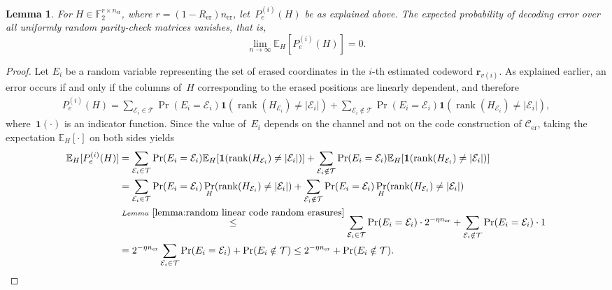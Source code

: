 \documentclass[journal,letterpaper,onecolumn,11pt]{IEEEtran}
\newcommand{\cC}{\mathcal{C}}
\newcommand{\cE}{\mathcal{E}}
\newcommand{\cT}{\mathcal{T}}
\newcommand{\rank}{\operatorname{rank}}
\newtheorem{lemma}{Lemma}
\begin{document}
\begin{lemma}\label{lemma:random_matrix_capacity}
    For $H \in \mathbb{F}_2^{r \times n_{\mathrm{er}}}$, where $r = (1-R_{\mathrm{er}})n_{\mathrm{er}}$, let~$P_e^{(i)}(H)$ be as explained above. 
    The expected probability of decoding error over all uniformly random parity-check matrices vanishes, that is,
    $$ \lim_{n \to \infty} \mathbb{E}_H[P_e^{(i)}(H)] = 0.$$
\end{lemma}
\begin{proof}
    Let $E_i$ be a random variable representing the set of erased coordinates in the $i$-th estimated codeword $\hat{\mathbf{r}}_{v(i)}$.
    As explained earlier, an error occurs if and only if the columns of~$H$ corresponding to the erased positions are linearly dependent, and therefore
    \begin{align*}
        P_e^{(i)}(H)=\sum_{\cE_i\in\mathcal{T}}\Pr(E_i=\cE_i)\mathbf{1}(\rank(H_{\cE_i})\ne |\cE_i|)+\sum_{\cE_i\notin\mathcal{T}}\Pr(E_i=\cE_i)\mathbf{1}(\rank(H_{\cE_i})\ne |\cE_i|),
    \end{align*}
    where~$\mathbf{1}(\cdot)$ is an indicator function.
    Since the value of~$E_i$ depends on the channel and not on the code construction of $\cC_{\mathrm{er}}$, taking the expectation $\mathbb{E}_H[\cdot]$ on both sides yields
    \begin{align*}
        \mathbb{E}_H[P_e^{(i)}(H)] &= \sum_{\cE_i\in\mathcal{T}}\Pr(E_i=\cE_i)\mathbb{E}_H[\mathbf{1}(\rank(H_{\cE_i})\ne |\cE_i|)]  + \sum_{\cE_i\notin\mathcal{T}}\Pr(E_i=\cE_i)\mathbb{E}_H[\mathbf{1}(\rank(H_{\cE_i})\ne |\cE_i|)]\\
        &=\sum_{\cE_i\in\mathcal{T}}\Pr(E_i=\cE_i)\Pr_H(\rank(H_{\cE_i})\ne |\cE_i|)  + \sum_{\cE_i\notin\mathcal{T}}\Pr(E_i=\cE_i)\Pr_H(\rank(H_{\cE_i})\ne |\cE_i|)\\
        &\overset{Lemma~\ref{lemma:random linear code random erasures}}{\le}\sum_{\cE_i\in\mathcal{T}}\Pr(E_i=\cE_i) \cdot 2^{-\eta n_{\mathrm{er}}} + \sum_{\cE_i\notin\mathcal{T}}\Pr(E_i=\cE_i) \cdot 1 \\
        &= 2^{-\eta n_{\mathrm{er}}} \sum_{\cE_i\in\mathcal{T}}\Pr(E_i=\cE_i) + \Pr(E_i \notin \mathcal{T})\le 2^{-\eta n_{\mathrm{er}}} + \Pr(E_i \notin \mathcal{T}).
    \end{align*}
    

\end{proof}
\end{document}
